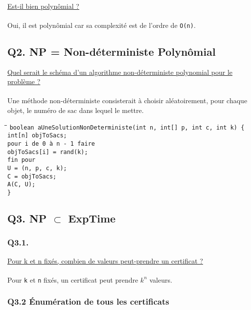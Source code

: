 ~\\
\underline{Est-il bien polynômial ?}
~\\~\\
Oui, il est polynômial car sa complexité est de l'ordre de \verb+O(n)+.

\subsection*{Q2. NP = Non-déterministe Polynômial}

\underline{Quel serait le schéma d'un algorithme non-déterministe polynomial pour le problème ?}
~\\~\\
Une méthode non-déterministe consisterait à choisir aléatoirement, pour chaque objet, le numéro de sac dans lequel le mettre.

\begin{tabbing}
	\hspace{1cm}\=\hspace{1cm}\=\hspace{1cm}\=\kill
	\verb+boolean aUneSolutionNonDeterministe(int n, int[] p, int c, int k) {+\\
		\>\verb+int[n] objToSacs;+\\
		\>\verb+pour i de 0 à n - 1 faire+\\
			\>\>\verb+objToSacs[i] = rand(k);+\\
		\>\verb+fin pour+\\
		\>\verb+U = (n, p, c, k);+\\
		\>\verb+C = objToSacs;+\\
		\>\verb+A(C, U);+\\
	\verb+}+
\end{tabbing}

\subsection*{Q3. NP $\subset$ ExpTime}

\subsubsection{Q3.1.}

\underline{Pour k et n fixés, combien de valeurs peut-prendre un certificat ?}
~\\~\\
Pour \verb+k+ et \verb+n+ fixés, un certificat peut prendre $k^n$ valeurs.

\subsubsection{Q3.2 Énumération de tous les certificats}

